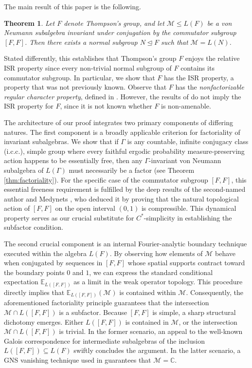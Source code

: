 \documentclass[11pt]{amsart}
\newtheorem{theorem}{Theorem}[section]
\theoremstyle{definition}
\newcommand{\C}{\mathbb{C}}
\newcommand{\cM}{\mathcal{M}}
\newcommand{\EE}{\mathbb{E}}
\begin{document}
The main result of this paper is the following.

\begin{theorem}
\label{thm:mainintro}
Let $F$ denote Thompson's group, and let $\cM \le L(F)$ be a von Neumann subalgebra invariant under conjugation by the commutator subgroup $[F,F]$. Then there exists a normal subgroup $N \trianglelefteq F$ such that $\cM = L(N)$.
\end{theorem}
Stated differently, this establishes that Thompson's group $F$ enjoys the relative ISR property since every non-trivial normal subgroup of $F$ contains its commutator subgroup. In particular, we show that $F$ has the ISR property, a property that was not previously known. Observe that $F$ has the \textit{nonfactorizable regular character property}, defined in \cite{DJ24}. However, the results of \cite{DJ24} do not imply the ISR property for $F$, since it is not known whether $F$ is non-amenable.

The architecture of our proof integrates two primary components of differing natures. The first component is a broadly applicable criterion for factoriality of invariant subalgebras. We show that if $\Gamma$ is any countable, infinite conjugacy class (i.c.c.), simple group where every faithful ergodic probability measure-preserving action happens to be essentially free, then any $\Gamma$-invariant von Neumann subalgebra of $L(\Gamma)$ must necessarily be a factor (see Theorem \ref{thm:factoriality}). For the specific case of the commutator subgroup $[F,F]$, this essential freeness requirement is fulfilled by the deep results of the second-named author and Medynets \cite{DM14}, who deduced it by proving that the natural topological action of $[F,F]$ on the open interval $(0,1)$ is compressible. This dynamical property serves as our crucial substitute for $C^*$-simplicity in establishing the subfactor condition.

The second crucial component is an internal Fourier-analytic boundary technique executed within the algebra $L(F)$. By observing how elements of $\cM$ behave when conjugated by sequences in $[F,F]$ whose spatial supports contract toward the boundary points $0$ and $1$, we can express the standard conditional expectation $\EE_{L([F,F])}$ as a limit in the weak operator topology. This procedure directly implies that $\EE_{L([F,F])}(\cM)$ is contained within $\cM$. Consequently, the aforementioned factoriality principle guarantees that the intersection $\cM \cap L([F,F])$ is a subfactor. Because $[F,F]$ is simple, a sharp structural dichotomy emerges. Either $L([F,F])$ is contained in $\cM$, or the intersection $\cM \cap L([F,F])$ is trivial. In the former scenario, an appeal to the well-known Galois correspondence for intermediate subalgebras of the inclusion $L([F,F]) \subseteq L(F)$ swiftly concludes the argument. In the latter scenario, a GNS vanishing technique used in \cite{DJ24} guarantees that $\cM = \C$.
\end{document}
